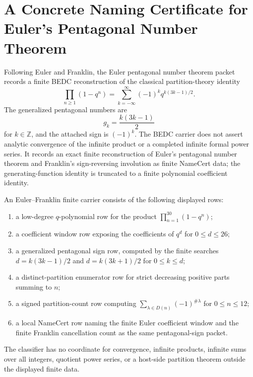\chapter{A Concrete Naming Certificate for Euler's Pentagonal Number Theorem}
\label{ch:concrete-instances-euler-pentagonal-number-theorem-namecert}

Following Euler and Franklin, the Euler pentagonal number theorem packet records a finite BEDC reconstruction of the classical partition-theory identity
$$
\prod_{n\geq 1}(1-q^n)=\sum_{k=-\infty}^{\infty}(-1)^k q^{k(3k-1)/2}.
$$
The generalized pentagonal numbers are
$$
g_k=\frac{k(3k-1)}{2}
$$
for $k\in\mathbb{Z}$, and the attached sign is $(-1)^k$. The BEDC carrier does not assert analytic convergence of the infinite product or a completed infinite formal power series. It records an exact finite reconstruction of Euler's pentagonal number theorem and Franklin's sign-reversing involution as finite NameCert data; the generating-function identity is truncated to a finite polynomial coefficient identity.

\begin{definition}
\label{def:euler-pentagonal-number-theorem-finite-carrier}
An Euler--Franklin finite carrier consists of the following displayed rows:
\begin{enumerate}
\item a low-degree $q$-polynomial row for the product $\prod_{n=1}^{30}(1-q^n)$;
\item a coefficient window row exposing the coefficients of $q^d$ for $0\leq d\leq 26$;
\item a generalized pentagonal sign row, computed by the finite searches $d=k(3k-1)/2$ and $d=k(3k+1)/2$ for $0\leq k\leq d$;
\item a distinct-partition enumerator row for strict decreasing positive parts summing to $n$;
\item a signed partition-count row computing $\sum_{\lambda\in D(n)}(-1)^{\#\lambda}$ for $0\leq n\leq 12$;
\item a local NameCert row naming the finite Euler coefficient window and the finite Franklin cancellation count as the same pentagonal-sign packet.
\end{enumerate}
The classifier has no coordinate for convergence, infinite products, infinite sums over all integers, quotient power series, or a host-side partition theorem outside the displayed finite data.
\end{definition}

